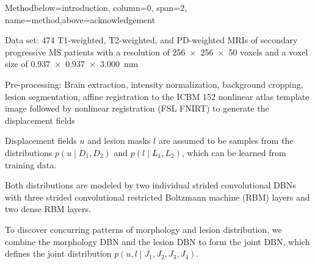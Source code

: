 \documentclass[%
landscape,paperwidth=42in,paperheight=48in,%
margin=2cm,
fontscale=0.295
]{baposter}
\begin{document}
\begin{poster}
\begin{headerblock}{Method}{below=introduction, column=0, span=2,
name=method,above=acknowledgement}
\begin{compactdesc}
  \item[Data set:] 474 T1-weighted, T2-weighted, and PD-weighted MRIs of
  secondary progressive MS patients with a resolution of \num{256x256x50} voxels
 and a voxel size of \SI{0.937x0.937x3.000}{\milli\meter}
 \item[Pre-processing:] Brain extraction, intensity normalization, background
 cropping, lesion segmentation, affine registration to the ICBM 152 nonlinear
 atlas template image followed by nonlinear registration (FSL FNIRT) to generate the
 displacement fields
 
\end{compactdesc}
\begin{compactitem}

\item Displacement fields $u$ and lesion masks $l$ are assumed to be samples
from the distributions $p(u \mid D_1, D_2)$ and $p(l \mid L_1, L_2)$, which can
be learned from training data.
 
\item Both distributions are modeled by two individual strided convolutional
DBNs with three strided convolutional restricted Boltzmann machine (RBM) layers
and two dense RBM layers.


\item To discover concurring patterns of morphology and lesion distribution, we
combine the morphology DBN and the lesion DBN to form the joint DBN, which
defines the joint distribution $p(u, l \mid J_1, J_2, J_3, J_4)$.
 
\end{compactitem}
\vspace{2em}
%
\end{headerblock}


\end{poster}
\end{document}
